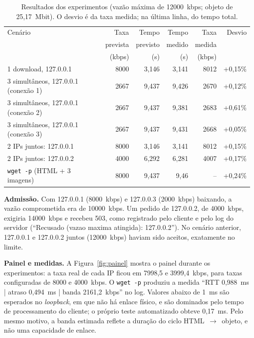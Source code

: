 \documentclass[12pt,a4paper]{article}
\begin{document}
\begin{table}[H]
\centering
\caption{Resultados dos experimentos (vazão máxima de 12000~kbps; objeto de 25,17~Mbit). O desvio é da taxa medida; na última linha, do tempo total.}
\label{tab:resultados}
\small
\setlength{\tabcolsep}{4pt}
\begin{tabularx}{\linewidth}{@{}Xrrrrr@{}}
\toprule
Cenário & Taxa & Tempo & Tempo & Taxa & Desvio \\
 & prevista & previsto & medido & medida & \\
 & (kbps) & (s) & (s) & (kbps) & \\
\midrule
1 download, 127.0.0.1 & 8000 & 3,146 & 3,141 & 8012 & +0,15\% \\
3 simultâneos, 127.0.0.1 (conexão 1) & 2667 & 9,437 & 9,426 & 2670 & +0,12\% \\
3 simultâneos, 127.0.0.1 (conexão 2) & 2667 & 9,437 & 9,381 & 2683 & +0,61\% \\
3 simultâneos, 127.0.0.1 (conexão 3) & 2667 & 9,437 & 9,431 & 2668 & +0,05\% \\
2 IPs juntos: 127.0.0.1 & 8000 & 3,146 & 3,141 & 8012 & +0,15\% \\
2 IPs juntos: 127.0.0.2 & 4000 & 6,292 & 6,281 & 4007 & +0,17\% \\
\texttt{wget -p} (HTML + 3 imagens) & 8000 & 9,437 & 9,46 & -- & +0,24\% \\
\bottomrule
\end{tabularx}
\end{table}

\textbf{Admissão.} Com 127.0.0.1 (8000~kbps) e 127.0.0.3 (2000~kbps) baixando, a vazão
comprometida era de 10000~kbps. Um pedido de 127.0.0.2, de 4000~kbps, exigiria
14000~kbps e recebeu 503, como registrado pelo cliente e pelo log do servidor
(``Recusado (vazao maxima atingida): 127.0.0.2''). No cenário anterior, 127.0.0.1 e
127.0.0.2 juntos (12000~kbps) haviam sido aceitos, exatamente no limite.

\textbf{Painel e medidas.} A Figura~\ref{fig:painel} mostra o painel durante os
experimentos: a taxa real de cada IP ficou em 7998,5 e 3999,4~kbps, para taxas
configuradas de 8000 e 4000~kbps. O \texttt{wget -p} produziu a medida
``RTT 0,988~ms | atraso 0,494~ms | banda 2161,2~kbps'' no log. Valores abaixo de 1~ms são
esperados no \textit{loopback}, em que não há enlace físico, e são dominados pelo tempo de
processamento do cliente; o próprio teste automatizado obteve 0,17~ms. Pelo mesmo motivo,
a banda estimada reflete a duração do ciclo HTML~$\rightarrow$~objeto, e não uma
capacidade de enlace.
\end{document}
